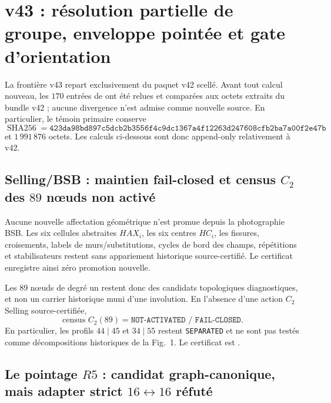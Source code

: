 \documentclass[11pt,a4paper]{article}
\newcommand{\certSeparated}{\texttt{SEPARATED}}
\begin{document}
\section{v43 : résolution partielle de groupe, enveloppe pointée et gate d'orientation}

La frontière v43 repart exclusivement du paquet v42 scellé. Avant tout calcul nouveau, les $170$ entrées de  ont été relues et comparées aux octets extraits du bundle v42 ; aucune divergence n'est admise comme nouvelle source. En particulier, le témoin primaire  conserve
\[
 \operatorname{SHA256}=\texttt{423da98bd897c5dcb2b3556f4c9dc1367a4f12263d247608cfb2ba7a00f2e47b}
\]
et $1\,991\,876$ octets. Les calculs ci-dessous sont donc append-only relativement à v42.

\subsection{Selling/BSB : maintien fail-closed et census $C_2$ des $89$ nœuds non activé}

Aucune nouvelle affectation géométrique n'est promue depuis la photographie BSB. Les six cellules abstraites $HAX_i$, les six centres $HC_i$, les fissures, croisements, labels de murs/substitutions, cycles de bord des champs, répétitions et stabilisateurs restent sans appariement historique source-certifié. Le certificat  enregistre ainsi zéro promotion nouvelle.

Les $89$ nœuds de degré un restent donc des candidats topologiques diagnostiques, et non un carrier historique muni d'une involution. En l'absence d'une action $C_2$ Selling source-certifiée,
\[
 \boxed{\text{census }C_2(89)=\texttt{NOT-ACTIVATED / FAIL-CLOSED}.}
\]
En particulier, les profils $44\mid45$ et $34\mid55$ restent \certSeparated{} et ne sont pas testés comme décompositions historiques de la Fig.~1. Le certificat est .

\subsection{Le pointage $R5$ : candidat graph-canonique, mais adapter strict $16\leftrightarrow16$ réfuté}
\end{document}
